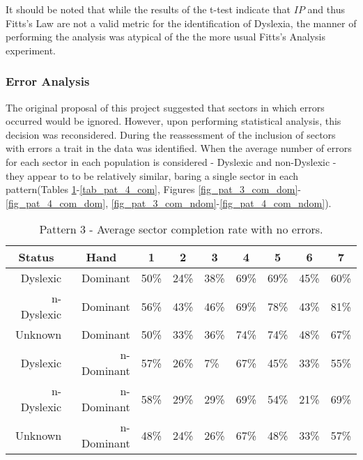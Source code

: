 		It should be noted that while the results of the t-test indicate that \(IP\) and thus Fitts’s Law are not a valid metric for the identification of Dyslexia, the manner of performing the analysis was atypical of the the more usual Fitts’s Analysis experiment.

	\subsubsection{Error Analysis}
		The original proposal of this project suggested that sectors in which errors occurred would be ignored. However, upon performing statistical analysis, this decision was reconsidered. During the reassessment of the inclusion of sectors with errors a trait in the data was identified. When the average number of errors for each sector in each population is considered - Dyslexic and non-Dyslexic - they appear to to be relatively similar, baring a single sector in each pattern(Tables \ref{tab_pat_3_com}-\ref{tab_pat_4_com}, Figures \ref{fig_pat_3_com_dom}-\ref{fig_pat_4_com_dom}, \ref{fig_pat_3_com_ndom}-\ref{fig_pat_4_com_ndom}).
					
		\begin{table}[h]
			\centering
			\caption{Pattern 3 - Average sector completion rate with no errors.}
			\label{tab_pat_3_com}
			\begin{tabularx}{\textwidth}{|r|r|X|X|X|X|X|X|X|}
				\hline
				\multicolumn{1}{|c|}{\textbf{Status}} & \multicolumn{1}{c|}{\textbf{Hand}} & \multicolumn{1}{c|}{\textbf{1}} & \multicolumn{1}{c|}{\textbf{2}} & \multicolumn{1}{c|}{\textbf{3}} & \multicolumn{1}{c|}{\textbf{4}} & \multicolumn{1}{c|}{\textbf{5}} & \multicolumn{1}{c|}{\textbf{6}} & \multicolumn{1}{c|}{\textbf{7}} \\ \hline
				Dyslexic                              & Dominant                           & 50\%       & 24\%       & 38\%       & 69\%       & 69\%       & 45\%       & 60\%       \\ \hline
				n-Dyslexic                          & Dominant                           & 56\%       & 43\%       & 46\%       & 69\%       & 78\%       & 43\%       & 81\%       \\ \hline
				Unknown                     & Dominant                           & 50\%       & 33\%       & 36\%       & 74\%       & 74\%       & 48\%       & 67\%       \\ \hline
				Dyslexic                              & n-Dominant                       & 57\%       & 26\%       & 7\%        & 67\%       & 45\%       & 33\%       & 55\%       \\ \hline
				n-Dyslexic                          & n-Dominant                       & 58\%       & 29\%       & 29\%       & 69\%       & 54\%       & 21\%       & 69\%       \\ \hline
				Unknown                    & n-Dominant                       & 48\%       & 24\%       & 26\%       & 67\%       & 48\%       & 33\%       & 57\%       \\ \hline
			\end{tabularx}
		\end{table}

